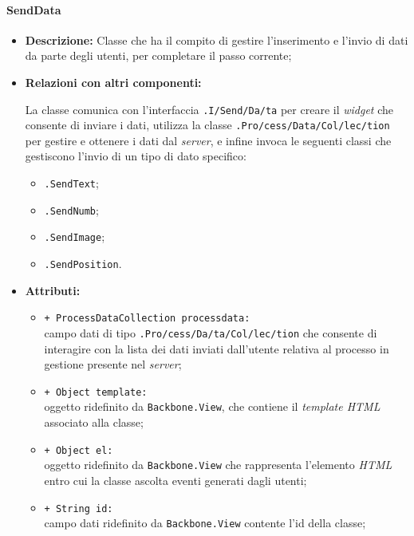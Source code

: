 \paragraph{SendData}
\label{sendData}
\begin{flushleft}
\begin{itemize}
\item \textbf{Descrizione:} Classe che ha il compito di gestire l'inserimento e l'invio di dati da parte degli utenti, per completare il passo corrente;
\item \textbf{Relazioni con altri componenti:}
\begin{sloppypar}
La classe comunica con l'interfaccia \texttt{\viewUser{}.I\fshyp{}Send\fshyp{}Da\fshyp{}ta} per creare il \textit{widget} che consente di inviare i dati, utilizza la classe \texttt{\collection{}.Pro\fshyp{}cess\fshyp{}Data\fshyp{}Col\fshyp{}lec\fshyp{}tion} per gestire e ottenere i dati dal \textit{server}, e infine invoca le seguenti classi che gestiscono l'invio di un tipo di dato specifico:
\begin{itemize}
	\item \texttt{\logicUser{}.SendText};
	\item \texttt{\logicUser{}.SendNumb};
	\item \texttt{\logicUser{}.SendImage};
	\item \texttt{\logicUser{}.SendPosition}.
\end{itemize}
\end{sloppypar}
\item \textbf{Attributi:}
\begin{sloppypar}
\begin{itemize}
\item \texttt{+ ProcessDataCollection processdata:}\\ campo dati di tipo \texttt{\collection{}.Pro\fshyp{}cess\fshyp{}Da\fshyp{}ta\fshyp{}Col\fshyp{}lec\fshyp{}tion} che consente di interagire con la lista dei dati inviati dall'utente relativa al processo in gestione presente nel \textit{server};
\item \texttt{+ Object template:}\\ oggetto ridefinito da \texttt{Backbone.View}, che contiene il \textit{template HTML} associato alla classe;
\item \texttt{+ Object el:}\\ oggetto ridefinito da \texttt{Backbone.View} che rappresenta l'elemento \textit{HTML} entro cui la classe ascolta eventi generati dagli utenti;
\item \texttt{+ String id:}\\ campo dati ridefinito da \texttt{Backbone.View} contente l'id della classe;

\end{itemize}
\end{sloppypar}
\end{itemize}
\end{flushleft}
